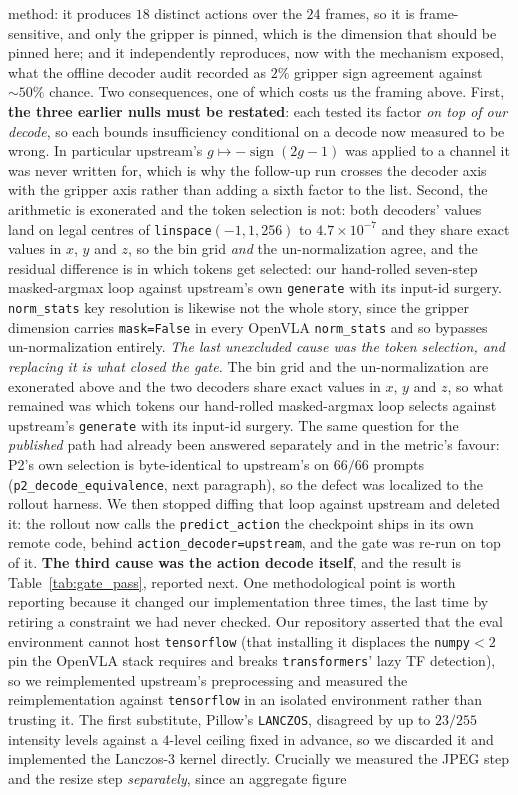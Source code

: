 \documentclass{article}
\begin{document}
method: it produces $18$ distinct actions over the $24$ frames, so it is frame-sensitive, and only the gripper is pinned, which is the dimension that should be pinned here; and it independently reproduces, now with the mechanism exposed, what the offline decoder audit recorded as $2\%$ gripper sign agreement against ${\sim}50\%$ chance. Two consequences, one of which costs us the framing above. First, \textbf{the three earlier nulls must be restated}: each tested its factor \emph{on top of our decode}, so each bounds insufficiency conditional on a decode now measured to be wrong. In particular upstream's $g \mapsto -\operatorname{sign}(2g{-}1)$ was applied to a channel it was never written for, which is why the follow-up run crosses the decoder axis with the gripper axis rather than adding a sixth factor to the list. Second, the arithmetic is exonerated and the token selection is not: both decoders' values land on legal centres of \texttt{linspace}$(-1,1,256)$ to $4.7{\times}10^{-7}$ and they share exact values in $x$, $y$ and $z$, so the bin grid \emph{and} the un-normalization agree, and the residual difference is in which tokens get selected: our hand-rolled seven-step masked-argmax loop against upstream's own \texttt{generate} with its input-id surgery. \texttt{norm\_stats} key resolution is likewise not the whole story, since the gripper dimension carries \texttt{mask=False} in every OpenVLA \texttt{norm\_stats} and so bypasses un-normalization entirely. \emph{The last unexcluded cause was the token selection, and replacing it is what closed the gate.} The bin grid and the un-normalization are exonerated above and the two decoders share exact values in $x$, $y$ and $z$, so what remained was which tokens our hand-rolled masked-argmax loop selects against upstream's \texttt{generate} with its input-id surgery. The same question for the \emph{published} path had already been answered separately and in the metric's favour: P2's own selection is byte-identical to upstream's on $66/66$ prompts (\texttt{p2\_decode\_equivalence}, next paragraph), so the defect was localized to the rollout harness. We then stopped diffing that loop against upstream and deleted it: the rollout now calls the \texttt{predict\_action} the checkpoint ships in its own remote code, behind \texttt{action\_decoder=upstream}, and the gate was re-run on top of it. \textbf{The third cause was the action decode itself}, and the result is Table~\ref{tab:gate_pass}, reported next. One methodological point is worth reporting because it changed our implementation three times, the last time by retiring a constraint we had never checked. Our repository asserted that the eval environment cannot host \texttt{tensorflow} (that installing it displaces the \texttt{numpy}${<}2$ pin the OpenVLA stack requires and breaks \texttt{transformers}' lazy TF detection), so we reimplemented upstream's preprocessing and measured the reimplementation against \texttt{tensorflow} in an isolated environment rather than trusting it. The first substitute, Pillow's \texttt{LANCZOS}, disagreed by up to $23/255$ intensity levels against a $4$-level ceiling fixed in advance, so we discarded it and implemented the Lanczos-3 kernel directly. Crucially we measured the JPEG step and the resize step \emph{separately}, since an aggregate figure 
\end{document}
